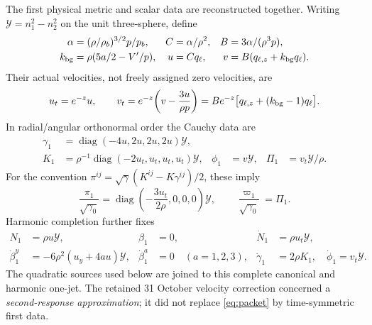 \documentclass[11pt]{article}
\begin{document}
The first physical metric and scalar data are reconstructed together.
Writing $\mathcal Y=n_1^2-n_2^2$ on the unit three-sphere, define
\begin{equation}
\begin{aligned}
 \alpha&=(\rho/\rho_b)^{3/2}p/p_b,&
 C&=\alpha/\rho^2,& B&=3\alpha/(\rho^3p),\\
 k_{\rm bg}&=\rho(5a/2-V'/p),&
 u&=Cq_\ell,&v&=B(q_{\ell,z}+k_{\rm bg}q_\ell).
\end{aligned}
\end{equation}
Their actual velocities, not freely assigned zero velocities, are
\begin{equation}
 u_t=e^{-z}u,\qquad
 v_t=e^{-z}\!\left(v-\frac{3u}{\rho p}\right)
     =Be^{-z}\big[q_{\ell,z}+(k_{\rm bg}-1)q_\ell\big].
 \label{eq:velocities}
\end{equation}
In radial/angular orthonormal order the Cauchy data are
\begin{equation}
\begin{aligned}
 \gamma_1&=\operatorname{diag}(-4u,2u,2u,2u)\mathcal Y,\\
 K_1&=\rho^{-1}\operatorname{diag}(-2u_t,u_t,u_t,u_t)\mathcal Y,
 &\phi_1&=v\mathcal Y,&\Pi_1&=v_t\mathcal Y/\rho.
\end{aligned}
\label{eq:firstdata}
\end{equation}
For the convention
$\pi^{ij}=\sqrt\gamma(K^{ij}-K\gamma^{ij})/2$, these imply
\begin{equation}
 \frac{\pi_1}{\sqrt{\gamma_0}}
 =\operatorname{diag}\!\left(-\frac{3u_t}{2\rho},0,0,0\right)\mathcal Y,
 \qquad \frac{\varpi_1}{\sqrt{\gamma_0}}=\Pi_1.
 \label{eq:canonical}
\end{equation}
Harmonic completion further fixes
\begin{equation}
\begin{aligned}
 N_1&=\rho u\mathcal Y,&\beta_1&=0,&
 \dot N_1&=\rho u_t\mathcal Y,\\
 \dot\beta_1^y&=-6\rho^2(u_y+4au)\mathcal Y,&
 \dot\beta_1^a&=0\quad(a=1,2,3),&
 \dot\gamma_1&=2\rho K_1,\quad\dot\phi_1=v_t\mathcal Y.
\end{aligned}
\label{eq:harmonic}
\end{equation}
The quadratic sources used below are joined to this complete canonical and
harmonic one-jet. The retained 31 October velocity correction concerned a
\emph{second-response approximation}; it did not replace
\eqref{eq:packet} by time-symmetric first data.
\end{document}
